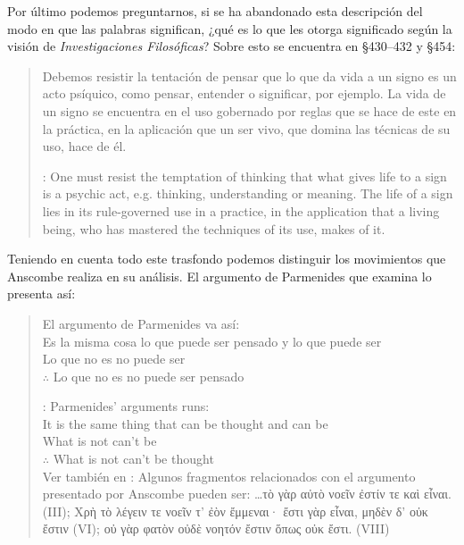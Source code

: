   Por último podemos preguntarnos, si se ha abandonado esta descripción del modo en que las palabras significan, ¿qué es lo que les otorga significado según la visión de \emph{Investigaciones Filosóficas}? Sobre esto se encuentra en \S430--432 y \S454: \blockquote[{\cite[4]{hacker2000mind}}: One must resist the temptation of thinking that what gives life to a sign is a psychic act, e.g. thinking, understanding or meaning. The life of a sign lies in its rule-governed use in a practice, in the application that a living being, who has mastered the techniques of its use, makes of it.]{Debemos resistir la tentación de pensar que lo que da vida a un signo es un acto psíquico, como pensar, entender o significar, por ejemplo. La vida de un signo se encuentra en el uso gobernado por reglas que se hace de este en la práctica, en la aplicación que un ser vivo, que domina las técnicas de su uso, hace de él.}

  Teniendo en cuenta todo este trasfondo podemos distinguir los movimientos que Anscombe realiza en su análisis. El argumento de Parmenides que examina lo presenta así: \blockquote[{\cite[3]{anscombe1981parmenides:pmc}}: Parmenides' arguments runs:\\
  It is the same thing that can be thought and can be\\
  What is not can't be\\
  $\therefore$ What is not can't be thought\\
  Ver también en {\cite[22--25]{parmenides2007poema}}: Algunos fragmentos relacionados con el argumento presentado por Anscombe pueden ser: \ldots\textgreek{τὸ γὰρ αὐτὸ νοεῖν ἐστίν τε καὶ εἶναι.} (III); \textgreek{Χρὴ τὸ λέγειν τε νοεῖν τ' ἐὸν ἔμμεναι· ἔστι γὰρ εἶναι, μηδὲν δ' οὐκ ἔστιν} (VI); \textelp{} \textgreek{οὐ γὰρ φατὸν οὐδὲ νοητόν ἔστιν ὅπως οὐκ ἔστι.} (VIII)]{El argumento de Parmenides va así:\\
  Es la misma cosa lo que puede ser pensado y lo que puede ser\\
  Lo que no es no puede ser\\
  $\therefore$ Lo que no es no puede ser pensado}

